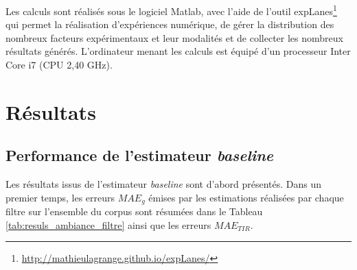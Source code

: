 Les calculs sont réalisés sous le logiciel Matlab, avec l'aide de l'outil expLanes\footnote{\url{http://mathieulagrange.github.io/expLanes/}} qui permet la réalisation d'expériences numérique, de gérer la distribution des nombreux facteurs expérimentaux et leur modalités et de collecter les nombreux résultats générés. L'ordinateur menant les calculs est équipé d'un processeur Inter Core i7 (CPU 2,40 GHz).

\section{Résultats}

\subsection{Performance de l'estimateur \textit{baseline}}

Les résultats issus de l'estimateur \textit{baseline} sont d'abord présentés. Dans un premier temps, les erreurs $MAE_g$ émises par les estimations réalisées par chaque filtre sur l'ensemble du corpus sont résumées dans le Tableau \ref{tab:resuls_ambiance_filtre} ainsi que les erreurs $MAE_{TIR}$.  

\begin{table}[h]
\centering
\caption{Erreur $MAE$ de l'estimateur \textit{baseline} selon $f_c$ sur l'ensemble du corpus \textit{Ambiance} et pour chaque TIR. En gras-rouge l'erreur $MAE_g$ la plus faible, en gras-noir, les erreurs $MAE_{TIR}$ les plus faibles selon les fréquences $f_c$.}
\label{tab:resuls_ambiance_filtre}
\end{table}

